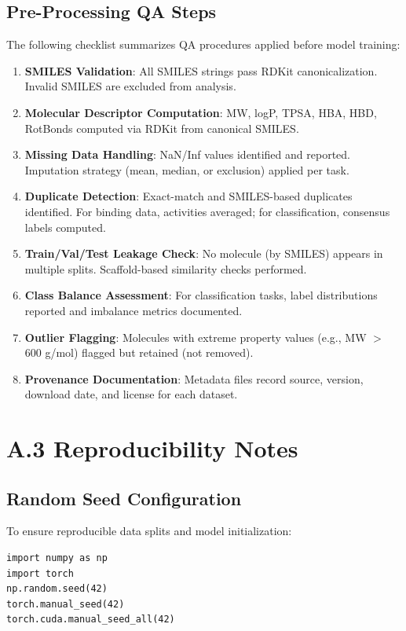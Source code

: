 \documentclass[a4paper,11pt,twoside]{report}
\begin{document}
\subsection*{Pre-Processing QA Steps}

The following checklist summarizes QA procedures applied before model training:

\begin{enumerate}
\item \textbf{SMILES Validation}: All SMILES strings pass RDKit canonicalization. Invalid SMILES are excluded from analysis.
\item \textbf{Molecular Descriptor Computation}: MW, logP, TPSA, HBA, HBD, RotBonds computed via RDKit from canonical SMILES.
\item \textbf{Missing Data Handling}: NaN/Inf values identified and reported. Imputation strategy (mean, median, or exclusion) applied per task.
\item \textbf{Duplicate Detection}: Exact-match and SMILES-based duplicates identified. For binding data, activities averaged; for classification, consensus labels computed.
\item \textbf{Train/Val/Test Leakage Check}: No molecule (by SMILES) appears in multiple splits. Scaffold-based similarity checks performed.
\item \textbf{Class Balance Assessment}: For classification tasks, label distributions reported and imbalance metrics documented.
\item \textbf{Outlier Flagging}: Molecules with extreme property values (e.g., MW $>$ 600 g/mol) flagged but retained (not removed).
\item \textbf{Provenance Documentation}: Metadata files record source, version, download date, and license for each dataset.
\end{enumerate}

\section*{A.3 Reproducibility Notes}

\subsection*{Random Seed Configuration}

\noindent To ensure reproducible data splits and model initialization:

\begin{verbatim}
import numpy as np
import torch
np.random.seed(42)
torch.manual_seed(42)
torch.cuda.manual_seed_all(42)
\end{verbatim}
\end{document}
